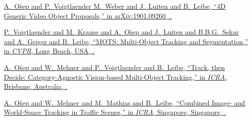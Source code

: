 \documentclass[letterpaper,MMMyyyy,nonstopmode]{simpleresumecv}
\begin{document}
\begin{Body}
\Gap
\href{https://arxiv.org/pdf/1901.09260.pdf}
{\underline{A.~O\u{s}ep} and P.~Voigtlaender M.~Weber and J.~Luiten and B.~Leibe,
``4D Generic Video Object Proposals,''
in arXiv:1901.09260,
.}

\Gap
\href{https://arxiv.org/abs/1902.03604}
{P.~Voigtlaender and M.~Krause and \underline{A.~O\u{s}ep} and J.~Luiten and B.B.G.~Sekar and A.~Geiger and B.~Leibe,
``MOTS: Multi-Object Tracking and Segmentation,''
in \textit{CVPR},
Long Beach, USA,
.}

\Gap
\href{https://arxiv.org/pdf/1712.07920.pdf}
{\underline{A.~Ošep} and W.~Mehner and P.~Voigtlaender and B.~Leibe,
``Track, then Decide: Category-Agnostic Vision-based Multi-Object Tracking,''
in \textit{ICRA},
Brisbane, Australia,
.}

\Gap
\href{https://www.vision.rwth-aachen.de/media/papers/paper_final_compressed.pdf}
{\underline{A.~Ošep} and W.~Mehner and M.~Mathias and B.~Leibe,
``Combined Image- and World-Space Tracking in Traffic Scenes,''
in \textit{ICRA},
Singapore, Singapore,
.}


%
%


\end{Body}
\end{document}
